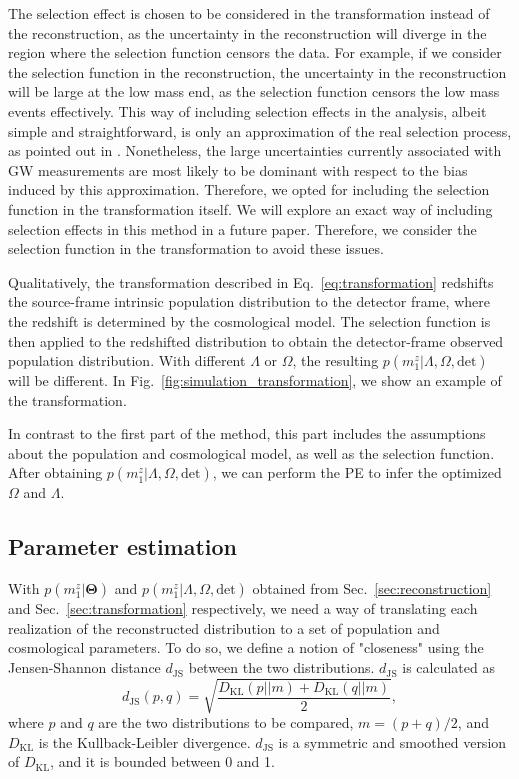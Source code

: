 \documentclass[sn-aps, pdflatex]{sn-jnl}
\begin{document}
The selection effect is chosen to be considered in the transformation instead of the reconstruction, as the uncertainty in the reconstruction will diverge in the region where the selection function censors the data.
For example, if we consider the selection function in the reconstruction, the uncertainty in the reconstruction will be large at the low mass end, as the selection function censors the low mass events effectively.
This way of including selection effects in the analysis, albeit simple and straightforward, is only an approximation of the real selection process, as pointed out in \cite{Essick:2023upv}.
Nonetheless, the large uncertainties currently associated with \ac{GW} measurements are most likely to be dominant with respect to the bias induced by this approximation.
Therefore, we opted for including the selection function in the transformation itself.
We will explore an exact way of including selection effects in this method in a future paper.
Therefore, we consider the selection function in the transformation to avoid these issues.

Qualitatively, the transformation described in Eq.~\eqref{eq:transformation} redshifts the source-frame intrinsic population distribution to the detector frame, where the redshift is determined by the cosmological model.
The selection function is then applied to the redshifted distribution to obtain the detector-frame observed population distribution.
With different $\Lambda$ or $\Omega$, the resulting $p(m^z_1|\Lambda, \Omega, \mathrm{det})$ will be different.
In Fig.~\ref{fig:simulation_transformation}, we show an example of the transformation.

In contrast to the first part of the method, this part includes the assumptions about the population and cosmological model, as well as the selection function.
After obtaining $p(m^z_1|\Lambda, \Omega, \mathrm{det})$, we can perform the \ac{PE} to infer the optimized $\Omega$ and $\Lambda$.

\subsection{Parameter estimation}
\label{sec:pe}

With $p(m^z_1|\mathbf{\Theta})$ and $p(m^z_1|\Lambda, \Omega, \mathrm{det})$ obtained from Sec.~\ref{sec:reconstruction} and Sec.~\ref{sec:transformation} respectively, we need a way of translating each realization of the reconstructed distribution to a set of population and cosmological parameters.
To do so, we define a notion of "closeness" using the Jensen-Shannon distance $d_\mathrm{JS}$ between the two distributions.
$d_\mathrm{JS}$ is calculated as
\begin{equation}
    d_\mathrm{JS}(p, q) = \sqrt{\frac{D_\mathrm{KL}(p||m) + D_\mathrm{KL}(q||m)}{2}},
\end{equation}
where $p$ and $q$ are the two distributions to be compared, $m = (p + q) / 2$, and $D_\mathrm{KL}$ is the Kullback-Leibler divergence.
$d_\mathrm{JS}$ is a symmetric and smoothed version of $D_\mathrm{KL}$, and it is bounded between 0 and 1.
\end{document}
